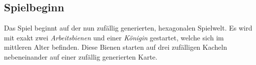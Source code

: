 \subsection{Spielbeginn}
Das Spiel beginnt auf der nun zufällig generierten, hexagonalen Spielwelt. Es wird mit exakt zwei \textit{Arbeitsbienen} und einer \textit{Königin} gestartet, welche sich im mittleren Alter befinden. Diese Bienen starten auf drei zufälligen Kacheln nebeneinander auf einer zufällig generierten Karte.

